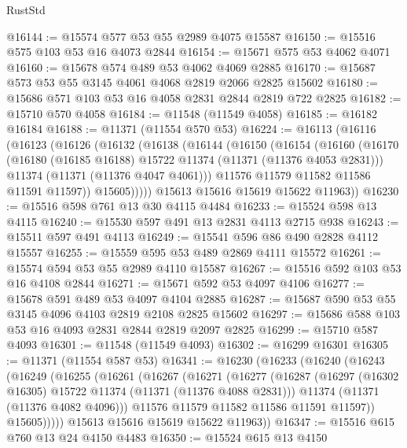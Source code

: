\begin{lexlean}{RustStd}
\begin{coremodule}
{\begin{coremodule}
{{{{{{{{{{{{{{{{{{{{{{{{{{{{{{{{{@16144 := @15574 @577 @53 @55 @2989 @4075 @15587
@16150 := @15516 @575 @103 @53 @16 @4073 @2844
@16154 := @15671 @575 @53 @4062 @4071
@16160 := @15678 @574 @489 @53 @4062 @4069 @2885
@16170 := @15687 @573 @53 @55 @3145 @4061 @4068 @2819 @2066 @2825 @15602
@16180 := @15686 @571 @103 @53 @16 @4058 @2831 @2844 @2819 @722 @2825
@16182 := @15710 @570 @4058
@16184 := @11548 (@11549 @4058)
@16185 := @16182 @16184
@16188 := @11371 (@11554 @570 @53)
@16224 := @16113
    (@16116
      (@16123
        (@16126
          (@16132
            (@16138
              (@16144
                (@16150
                  (@16154
                    (@16160
                      (@16170
                        (@16180 (@16185 @16188) @15722 @11374 (@11371 (@11376 @4053 @2831)))
                        @11374
                        (@11371 (@11376 @4047 @4061)))
                      @11576
                      @11579
                      @11582
                      @11586
                      @11591
                      @11597))
                  @15605)))))
        @15613
        @15616
        @15619
        @15622
        @11963))
@16230 := @15516 @598 @761 @13 @30 @4115 @4484
@16233 := @15524 @598 @13 @4115
@16240 := @15530 @597 @491 @13 @2831 @4113 @2715 @938
@16243 := @15511 @597 @491 @4113
@16249 := @15541 @596 @86 @490 @2828 @4112 @15557
@16255 := @15559 @595 @53 @489 @2869 @4111 @15572
@16261 := @15574 @594 @53 @55 @2989 @4110 @15587
@16267 := @15516 @592 @103 @53 @16 @4108 @2844
@16271 := @15671 @592 @53 @4097 @4106
@16277 := @15678 @591 @489 @53 @4097 @4104 @2885
@16287 := @15687 @590 @53 @55 @3145 @4096 @4103 @2819 @2108 @2825 @15602
@16297 := @15686 @588 @103 @53 @16 @4093 @2831 @2844 @2819 @2097 @2825
@16299 := @15710 @587 @4093
@16301 := @11548 (@11549 @4093)
@16302 := @16299 @16301
@16305 := @11371 (@11554 @587 @53)
@16341 := @16230
    (@16233
      (@16240
        (@16243
          (@16249
            (@16255
              (@16261
                (@16267
                  (@16271
                    (@16277
                      (@16287
                        (@16297 (@16302 @16305) @15722 @11374 (@11371 (@11376 @4088 @2831)))
                        @11374
                        (@11371 (@11376 @4082 @4096)))
                      @11576
                      @11579
                      @11582
                      @11586
                      @11591
                      @11597))
                  @15605)))))
        @15613
        @15616
        @15619
        @15622
        @11963))
@16347 := @15516 @615 @760 @13 @24 @4150 @4483
@16350 := @15524 @615 @13 @4150
}}}}}}}}}}}}}}}}}}}}}}}}}}}}}}}}}
\end{coremodule}}
\end{coremodule}
\end{lexlean}

